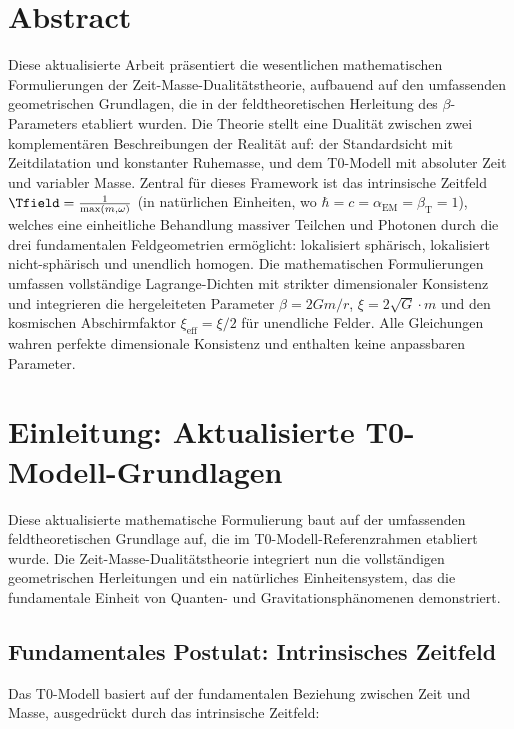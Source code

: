 \section*{Abstract}
		Diese aktualisierte Arbeit präsentiert die wesentlichen mathematischen Formulierungen der Zeit-Masse-Dualitätstheorie, aufbauend auf den umfassenden geometrischen Grundlagen, die in der feldtheoretischen Herleitung des $\beta$-Parameters etabliert wurden. Die Theorie stellt eine Dualität zwischen zwei komplementären Beschreibungen der Realität auf: der Standardsicht mit Zeitdilatation und konstanter Ruhemasse, und dem T0-Modell mit absoluter Zeit und variabler Masse. Zentral für dieses Framework ist das intrinsische Zeitfeld $\Tfield = \frac{1}{\max(m, \omega)}$ (in natürlichen Einheiten, wo $\hbar = c = \alpha_{\text{EM}} = \beta_{\text{T}} = 1$), welches eine einheitliche Behandlung massiver Teilchen und Photonen durch die drei fundamentalen Feldgeometrien ermöglicht: lokalisiert sphärisch, lokalisiert nicht-sphärisch und unendlich homogen. Die mathematischen Formulierungen umfassen vollständige Lagrange-Dichten mit strikter dimensionaler Konsistenz und integrieren die hergeleiteten Parameter $\beta = 2Gm/r$, $\xi = 2\sqrt{G} \cdot m$ und den kosmischen Abschirmfaktor $\xi_{\text{eff}} = \xi/2$ für unendliche Felder. Alle Gleichungen wahren perfekte dimensionale Konsistenz und enthalten keine anpassbaren Parameter.

	
	
	\section{Einleitung: Aktualisierte T0-Modell-Grundlagen}
	
	Diese aktualisierte mathematische Formulierung baut auf der umfassenden feldtheoretischen Grundlage auf, die im T0-Modell-Referenzrahmen etabliert wurde. Die Zeit-Masse-Dualitätstheorie integriert nun die vollständigen geometrischen Herleitungen und ein natürliches Einheitensystem, das die fundamentale Einheit von Quanten- und Gravitationsphänomenen demonstriert.
	
	\subsection{Fundamentales Postulat: Intrinsisches Zeitfeld}
	\label{subsec:fundamentales_postulat}
	
	Das T0-Modell basiert auf der fundamentalen Beziehung zwischen Zeit und Masse, ausgedrückt durch das intrinsische Zeitfeld:
	
